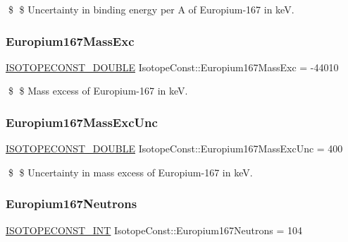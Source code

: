 \$ \$ Uncertainty in binding energy per A of Europium-\/167 in keV. \mbox{\label{group___isotope_const-_europium-_eu167_gac1ce9bd95251d17c3152951e01a50b25}} 
\subsubsection{\texorpdfstring{Europium167\+Mass\+Exc}{Europium167MassExc}}
{\footnotesize\ttfamily \mbox{\hyperlink{group___isotope_const-_macros_ga8f45a7272ce02c0b4c65c44636ed719a}{I\+S\+O\+T\+O\+P\+E\+C\+O\+N\+S\+T\+\_\+\+D\+O\+U\+B\+LE}} Isotope\+Const\+::\+Europium167\+Mass\+Exc = -\/44010}

\$ \$ Mass excess of Europium-\/167 in keV. \mbox{\label{group___isotope_const-_europium-_eu167_ga269cd03f42d908bfe3b5f18f74fa406b}} 
\subsubsection{\texorpdfstring{Europium167\+Mass\+Exc\+Unc}{Europium167MassExcUnc}}
{\footnotesize\ttfamily \mbox{\hyperlink{group___isotope_const-_macros_ga8f45a7272ce02c0b4c65c44636ed719a}{I\+S\+O\+T\+O\+P\+E\+C\+O\+N\+S\+T\+\_\+\+D\+O\+U\+B\+LE}} Isotope\+Const\+::\+Europium167\+Mass\+Exc\+Unc = 400}

\$ \$ Uncertainty in mass excess of Europium-\/167 in keV. \mbox{\label{group___isotope_const-_europium-_eu167_ga86856d6ef8cdb75ee6fd477ae229eaa8}} 
\subsubsection{\texorpdfstring{Europium167\+Neutrons}{Europium167Neutrons}}
{\footnotesize\ttfamily \mbox{\hyperlink{group___isotope_const-_macros_ga5f18360b3e99483a35c32d789e62621c}{I\+S\+O\+T\+O\+P\+E\+C\+O\+N\+S\+T\+\_\+\+I\+NT}} Isotope\+Const\+::\+Europium167\+Neutrons = 104}

